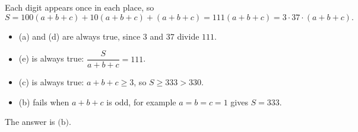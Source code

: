 Each digit appears once in each place, so
\[S=100(a+b+c)+10(a+b+c)+(a+b+c)=111(a+b+c)=3\cdot37\cdot(a+b+c).\]
\begin{itemize}
\item (a) and (d) are always true, since $3$ and $37$ divide $111$.
\item (e) is always true: $\dfrac{S}{a+b+c}=111$.
\item (c) is always true: $a+b+c\ge3$, so $S\ge333>330$.
\item (b) fails when $a+b+c$ is odd, for example $a=b=c=1$ gives $S=333$.
\end{itemize}
The answer is $\boxed{\text{(b)}}$.
